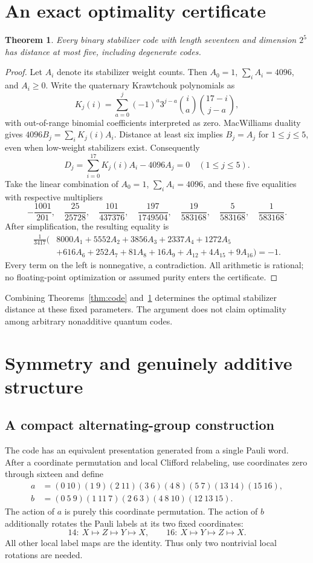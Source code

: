 \documentclass[11pt]{article}
\newtheorem{theorem}{Theorem}
\begin{document}
\section{An exact optimality certificate}
\begin{theorem}\label{thm:optimal}
Every binary stabilizer code with length seventeen and dimension $2^5$ has distance at most five, including degenerate codes.
\end{theorem}
\begin{proof}
Let $A_i$ denote its stabilizer weight counts. Then $A_0=1$, $\sum_iA_i=4096$, and $A_i\ge0$. Write the quaternary Krawtchouk polynomials as
\[
 K_j(i)=\sum_{a=0}^j(-1)^a3^{j-a}\binom ia\binom{17-i}{j-a},
\]
with out-of-range binomial coefficients interpreted as zero. MacWilliams duality gives $4096B_j=\sum_iK_j(i)A_i$. Distance at least six implies $B_j=A_j$ for $1\le j\le5$, even when low-weight stabilizers exist. Consequently
\[
 D_j=\sum_{i=0}^{17}K_j(i)A_i-4096A_j=0\quad(1\le j\le5).
\]
Take the linear combination of $A_0=1$, $\sum_iA_i=4096$, and these five equalities with respective multipliers
\[
 -\frac{1001}{201},\quad\frac{25}{25728},\quad
 \frac{101}{437376},\quad\frac{197}{1749504},\quad
 \frac{19}{583168},\quad\frac5{583168},\quad\frac1{583168}.
\]
After simplification, the resulting equality is
\begin{align*}
 \frac1{3417}(&8000A_1+5552A_2+3856A_3+2337A_4+1272A_5\\
 &+616A_6+252A_7+81A_8+16A_9+A_{12}+4A_{15}+9A_{16})=-1.
\end{align*}
Every term on the left is nonnegative, a contradiction. All arithmetic is rational; no floating-point optimization or assumed purity enters the certificate.
\end{proof}
Combining Theorems~\ref{thm:code} and~\ref{thm:optimal} determines the optimal stabilizer distance at these fixed parameters. The argument does not claim optimality among arbitrary nonadditive quantum codes.

\section{Symmetry and genuinely additive structure}
\subsection{A compact alternating-group construction}
The code has an equivalent presentation generated from a single Pauli word. After a coordinate permutation and local Clifford relabeling, use coordinates zero through sixteen and define
\begin{align*}
 a&=(0\ 10)(1\ 9)(2\ 11)(3\ 6)(4\ 8)(5\ 7)(13\ 14)(15\ 16),\\
 b&=(0\ 5\ 9)(1\ 11\ 7)(2\ 6\ 3)(4\ 8\ 10)(12\ 13\ 15).
\end{align*}
The action of $a$ is purely this coordinate permutation. The action of $b$ additionally rotates the Pauli labels at its two fixed coordinates:
\[
 14:\ X\mapsto Z\mapsto Y\mapsto X,\qquad
 16:\ X\mapsto Y\mapsto Z\mapsto X.
\]
All other local label maps are the identity. Thus only two nontrivial local rotations are needed.
\end{document}
